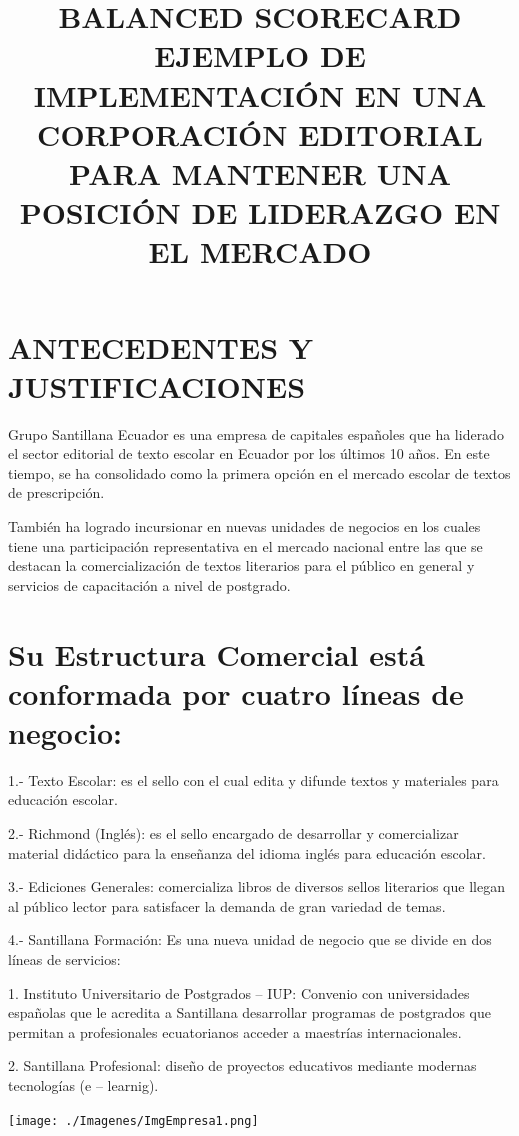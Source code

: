 \title{BALANCED SCORECARD EJEMPLO DE IMPLEMENTACIÓN EN UNA CORPORACIÓN EDITORIAL PARA MANTENER UNA POSICIÓN DE LIDERAZGO EN EL MERCADO}

\section{ANTECEDENTES Y JUSTIFICACIONES}
\item { Grupo Santillana Ecuador es una empresa de capitales españoles que ha liderado el sector editorial de texto escolar en Ecuador por los últimos 10 años. En este tiempo, se ha consolidado como la primera opción en el mercado escolar de textos de prescripción.

También ha logrado incursionar en nuevas unidades de negocios en los cuales tiene una participación representativa en el mercado nacional entre las que se destacan la comercialización de textos literarios para el público en general y servicios de capacitación a nivel de postgrado.}

\section{Su Estructura Comercial está conformada por cuatro líneas de negocio:}
\item { 1.-  Texto Escolar: es el sello con el cual edita y difunde textos y materiales para educación escolar.

2.- Richmond (Inglés): es el sello encargado de desarrollar y comercializar material didáctico para la enseñanza del idioma inglés para educación escolar.

3.- Ediciones Generales: comercializa libros de diversos sellos literarios que llegan al público lector para satisfacer la demanda de gran variedad de temas.

4.- Santillana Formación:  Es una nueva unidad de negocio que se divide en dos líneas de servicios:

1. Instituto Universitario de Postgrados – IUP: Convenio con universidades españolas que le acredita a Santillana desarrollar programas de postgrados que permitan a profesionales ecuatorianos acceder a maestrías internacionales.

2. Santillana Profesional: diseño de proyectos educativos mediante modernas tecnologías (e – learnig).}

\begin{center}
\texttt{[image: ./Imagenes/ImgEmpresa1.png]}
\end{center}

